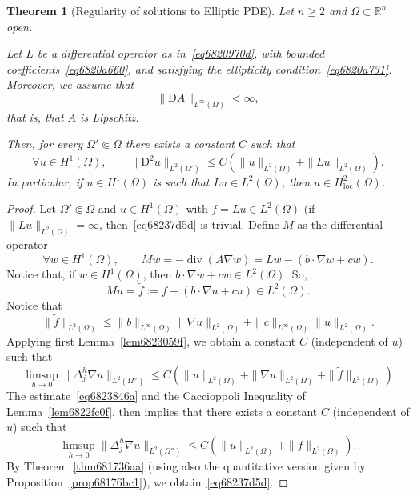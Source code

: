 \documentclass[a4paper,9pt]{amsart}
\newcommand{\R}{\mathbb{R}}	%
\newcommand{\Diff}{\mathrm{D}}
\renewcommand{\div}{\operatorname{div}}	%
\newcommand{\loc}{\mathrm{loc}}
\newcommand{\grad}{\nabla}
\theoremstyle{plain}
\newtheorem{theorem}[proposition]{Theorem}
\theoremstyle{definition}
\theoremstyle{remark}
\begin{document}
\begin{theorem}[Regularity of solutions to Elliptic PDE]\label{thm68237c1b}
	Let $n\ge2$ and $\Omega\subset\R^n$ open.
	
	Let $L$ be a differential operator as in~\eqref{eq6820970d},
	with bounded coefficients~\eqref{eq6820a660},
	and satisfying the ellipticity condition~\eqref{eq6820a731}.
	Moreover, we assume that
	\begin{equation}
		\|\Diff A\|_{L^\infty(\Omega)} < \infty ,
	\end{equation}
	that is, that $A$ is Lipschitz.
	
	Then, for every $\Omega'\Subset\Omega$ there exists a constant $C$ such that
	\begin{equation}\label{eq68237d5d}
		\forall u\in H^1(\Omega),\qquad
		\|\Diff^2u\|_{L^2(\Omega')} \le C (\|u\|_{L^2(\Omega)} + \|Lu\|_{L^2(\Omega)} ) .
	\end{equation}
	In particular, if $u\in H^1(\Omega)$ is such that $Lu\in L^2(\Omega)$, then $u\in H^2_\loc(\Omega)$.
\end{theorem}
\begin{proof}
	Let $\Omega'\Subset\Omega$ and $u\in H^1(\Omega)$ with $f=Lu\in L^2(\Omega)$ 
	(if $\|Lu\|_{L^2(\Omega)}=\infty$, then~\eqref{eq68237d5d} is trivial.
	Define $M$ as the differential operator
	\begin{equation}
		\forall w\in H^1(\Omega),\qquad
		Mw = -\div(A\grad w) = Lw - ( b\cdot\grad w + cw ) .
	\end{equation}
	Notice that, if $w\in H^1(\Omega)$, then $b\cdot\grad w + cw\in L^2(\Omega)$.
	So,
	\begin{equation}
		 Mu = \tilde f := f - (b\cdot\grad u + cu) \in L^2(\Omega) .
	\end{equation}
	Notice that
	\begin{equation}\label{eq6823846a}
		\|\tilde f\|_{L^2(\Omega)}
		\le \|b\|_{L^\infty(\Omega)} \|\grad u\|_{L^2(\Omega)} + \|c\|_{L^\infty(\Omega)} \|u\|_{L^2(\Omega)}.
	\end{equation}
	Applying first Lemma~\ref{lem6823059f},
	we obtain a constant $C$ (independent of $u$) such that
	\begin{equation}
		\limsup_{h\to0}\|\Delta_j^{h}\grad u\|_{L^2(\Omega'')} 
		\le C (\|u\|_{L^2(\Omega)} + \|\grad u\|_{L^2(\Omega)} + \|\tilde f\|_{L^2(\Omega)} ) 
	\end{equation}
	The estimate~\eqref{eq6823846a} and the Caccioppoli Inequality of Lemma~\ref{lem6822fc0f}, then implies that there exists a constant $C$ (independent of $u$) such that
	\begin{equation}
		\limsup_{h\to0}\|\Delta_j^{h}\grad u\|_{L^2(\Omega'')} 
		\le C (\|u\|_{L^2(\Omega)} + \| f\|_{L^2(\Omega)} ) .
	\end{equation}
	By Theorem~\ref{thm681736aa} (using also the quantitative version given by Proposition~\ref{prop68176bc1}), we obtain~\eqref{eq68237d5d}.
\end{proof}
\end{document}
